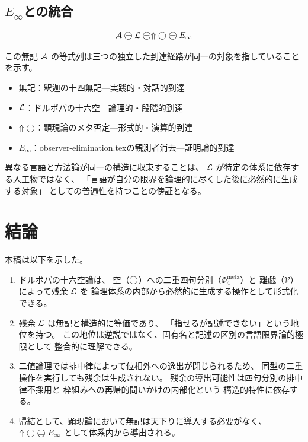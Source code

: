 \documentclass[11pt,a4paper]{article}
\theoremstyle{definition}
\newcommand{\Einfty}{E_\infty}
\newcommand{\Phimeta}{\Phi_{4}^{\mathrm{meta}}}
\begin{document}
\subsection{$\Einfty$との統合}

$$\Avyakata \mweq \Lhagma \mweq \metanegation\dfix \mweq \Einfty$$

この無記 $\mathcal{A}$ の等式列は三つの独立した到達経路が同一の対象を指していることを示す。

\begin{itemize}
  \item $\text{無記}$：釈迦の十四無記---実践的・対話的到達
  \item $\mathcal{L}$：ドルポパの十六空---論理的・段階的到達
  \item $\Uparrow\bigcirc$：顕現論のメタ否定---形式的・演算的到達
  \item $\Einfty$：observer-elimination.texの観測者消去---証明論的到達
\end{itemize}

異なる言語と方法論が同一の構造に収束することは、
$\mathcal{L}$ が特定の体系に依存する人工物ではなく、
「言語が自分の限界を論理的に尽くした後に必然的に生成する対象」
としての普遍性を持つことの傍証となる。

\section{結論}

本稿は以下を示した。

\begin{enumerate}
  \item ドルポパの十六空論は、
        空（$\bigcirc$）への二重四句分別（$\Phimeta$）と
        離戯（$\mathcal{V}$）によって残余 $\mathcal{L}$ を
        論理体系の内部から必然的に生成する操作として形式化できる。

  \item 残余 $\mathcal{L}$ は無記と構造的に等価であり、
        「指せるが記述できない」という地位を持つ。
        この地位は逆説ではなく、固有名と記述の区別の言語限界論的極限として
        整合的に理解できる。

  \item 二値論理では排中律によって位相外への逸出が閉じられるため、
        同型の二重操作を実行しても残余は生成されない。
        残余の導出可能性は四句分別の排中律不採用と
        枠組みへの再帰的問いかけの内部化という
        構造的特性に依存する。

  \item 帰結として、顕現論において無記は天下りに導入する必要がなく、
        $\metanegation\dfix \mweq \Einfty$
        として体系内から導出される。
\end{enumerate}
\end{document}
